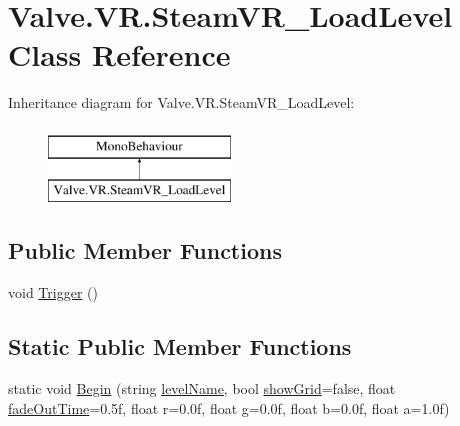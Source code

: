\hypertarget{class_valve_1_1_v_r_1_1_steam_v_r___load_level}{}\section{Valve.\+V\+R.\+Steam\+V\+R\+\_\+\+Load\+Level Class Reference}
\label{class_valve_1_1_v_r_1_1_steam_v_r___load_level}
Inheritance diagram for Valve.\+V\+R.\+Steam\+V\+R\+\_\+\+Load\+Level\+:\begin{figure}[H]
\begin{center}
\leavevmode
\includegraphics[height=2.000000cm]{class_valve_1_1_v_r_1_1_steam_v_r___load_level}
\end{center}
\end{figure}
\subsection*{Public Member Functions}
\begin{DoxyCompactItemize}
\item 
void \mbox{\hyperlink{class_valve_1_1_v_r_1_1_steam_v_r___load_level_a159effd47c6ba4c6e2d58951c17135d0}{Trigger}} ()
\end{DoxyCompactItemize}
\subsection*{Static Public Member Functions}
\begin{DoxyCompactItemize}
\item 
static void \mbox{\hyperlink{class_valve_1_1_v_r_1_1_steam_v_r___load_level_aed516148c0b0add76c609f6184550ac4}{Begin}} (string \mbox{\hyperlink{class_valve_1_1_v_r_1_1_steam_v_r___load_level_ac07ec4814e60ad5c6ccae6ed9d596ba5}{level\+Name}}, bool \mbox{\hyperlink{class_valve_1_1_v_r_1_1_steam_v_r___load_level_a45cda28d3ef83a848fb85e1b0fe70acd}{show\+Grid}}=false, float \mbox{\hyperlink{class_valve_1_1_v_r_1_1_steam_v_r___load_level_a7b1678ec4a9cfe4677f7bb62b4e2605d}{fade\+Out\+Time}}=0.\+5f, float r=0.\+0f, float g=0.\+0f, float b=0.\+0f, float a=1.\+0f)
\end{DoxyCompactItemize}
